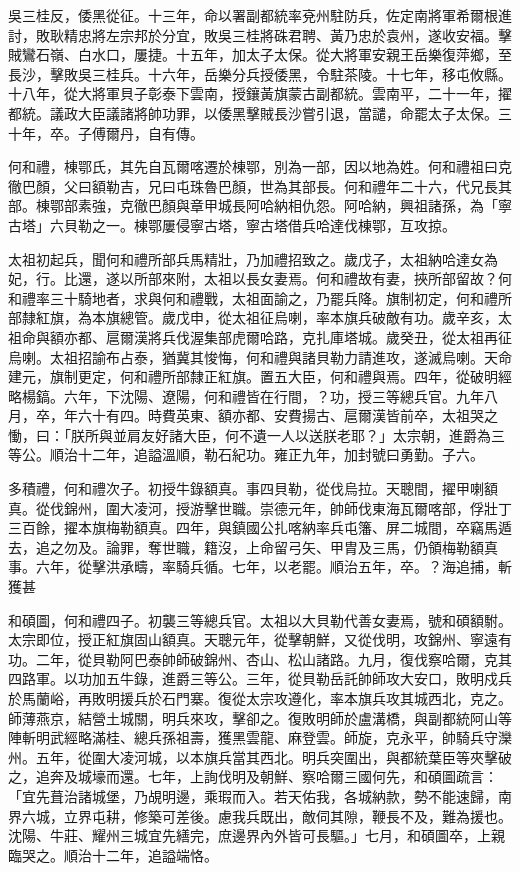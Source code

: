 \begin{pinyinscope}
吳三桂反，倭黑從征。十三年，命以署副都統率兗州駐防兵，佐定南將軍希爾根進討，敗耿精忠將左宗邦於分宜，敗吳三桂將硃君聘、黃乃忠於袁州，遂收安福。擊賊鸞石嶺、白水口，屢捷。十五年，加太子太保。從大將軍安親王岳樂復萍鄉，至長沙，擊敗吳三桂兵。十六年，岳樂分兵授倭黑，令駐茶陵。十七年，移屯攸縣。十八年，從大將軍貝子彰泰下雲南，授鑲黃旗蒙古副都統。雲南平，二十一年，擢都統。議政大臣議諸將帥功罪，以倭黑擊賊長沙嘗引退，當譴，命罷太子太保。三十年，卒。子傅爾丹，自有傳。

何和禮，棟鄂氏，其先自瓦爾喀遷於棟鄂，別為一部，因以地為姓。何和禮祖曰克徹巴顏，父曰額勒吉，兄曰屯珠魯巴顏，世為其部長。何和禮年二十六，代兄長其部。棟鄂部素強，克徹巴顏與章甲城長阿哈納相仇怨。阿哈納，興祖諸孫，為「寧古塔」六貝勒之一。棟鄂屢侵寧古塔，寧古塔借兵哈達伐棟鄂，互攻掠。

太祖初起兵，聞何和禮所部兵馬精壯，乃加禮招致之。歲戊子，太祖納哈達女為妃，行。比還，遂以所部來附，太祖以長女妻焉。何和禮故有妻，挾所部留故？何和禮率三十騎地者，求與何和禮戰，太祖面諭之，乃罷兵降。旗制初定，何和禮所部隸紅旗，為本旗總管。歲戊申，從太祖征烏喇，率本旗兵破敵有功。歲辛亥，太祖命與額亦都、扈爾漢將兵伐渥集部虎爾哈路，克扎庫塔城。歲癸丑，從太祖再征烏喇。太祖招諭布占泰，猶冀其悛悔，何和禮與諸貝勒力請進攻，遂滅烏喇。天命建元，旗制更定，何和禮所部隸正紅旗。置五大臣，何和禮與焉。四年，從破明經略楊鎬。六年，下沈陽、遼陽，何和禮皆在行間，？功，授三等總兵官。九年八月，卒，年六十有四。時費英東、額亦都、安費揚古、扈爾漢皆前卒，太祖哭之慟，曰：「朕所與並肩友好諸大臣，何不遺一人以送朕老耶？」太宗朝，進爵為三等公。順治十二年，追謚溫順，勒石紀功。雍正九年，加封號曰勇勤。子六。

多積禮，何和禮次子。初授牛錄額真。事四貝勒，從伐烏拉。天聰間，擢甲喇額真。從伐錦州，圍大凌河，授游擊世職。崇德元年，帥師伐東海瓦爾喀部，俘壯丁三百餘，擢本旗梅勒額真。四年，與鎮國公扎喀納率兵屯籓、屏二城間，卒竊馬遁去，追之勿及。論罪，奪世職，籍沒，上命留弓矢、甲胄及三馬，仍領梅勒額真事。六年，從擊洪承疇，率騎兵循。七年，以老罷。順治五年，卒。？海追捕，斬獲甚

和碩圖，何和禮四子。初襲三等總兵官。太祖以大貝勒代善女妻焉，號和碩額駙。太宗即位，授正紅旗固山額真。天聰元年，從擊朝鮮，又從伐明，攻錦州、寧遠有功。二年，從貝勒阿巴泰帥師破錦州、杏山、松山諸路。九月，復伐察哈爾，克其四路軍。以功加五牛錄，進爵三等公。三年，從貝勒岳託帥師攻大安口，敗明戍兵於馬蘭峪，再敗明援兵於石門寨。復從太宗攻遵化，率本旗兵攻其城西北，克之。師薄燕京，結營土城關，明兵來攻，擊卻之。復敗明師於盧溝橋，與副都統阿山等陣斬明武經略滿桂、總兵孫祖壽，獲黑雲龍、麻登雲。師旋，克永平，帥騎兵守灤州。五年，從圍大凌河城，以本旗兵當其西北。明兵突圍出，與都統葉臣等夾擊破之，追奔及城壕而還。七年，上詢伐明及朝鮮、察哈爾三國何先，和碩圖疏言：「宜先葺治諸城堡，乃覘明邊，乘瑕而入。若天佑我，各城納款，勢不能速歸，南界六城，立界屯耕，修築可差後。慮我兵既出，敵伺其隙，鞭長不及，難為援也。沈陽、牛莊、耀州三城宜先繕完，庶邊界內外皆可長驅。」七月，和碩圖卒，上親臨哭之。順治十二年，追謚端恪。


\end{pinyinscope}
